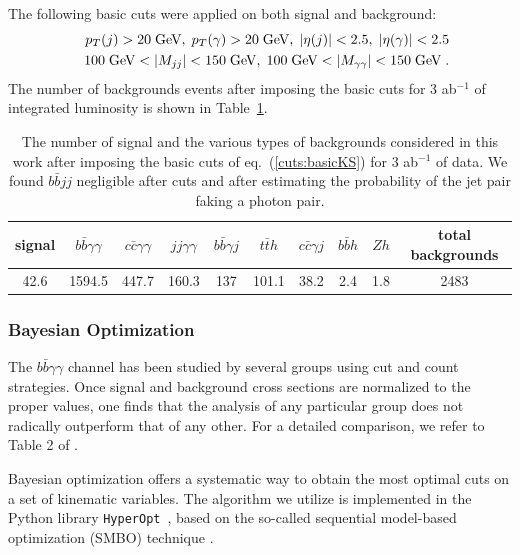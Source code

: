 The following basic cuts were applied on both signal and background:
%
\begin{eqnarray}
& & p_T(j) > 20\;\hbox{GeV},\; p_T(\gamma) > 20\;\hbox{GeV},\; |\eta(j)|<2.5,\; |\eta(\gamma)|<2.5 \nonumber \\
& & 100\;\hbox{GeV} < |M_{jj}| < 150\;\hbox{GeV},\; 100\;\hbox{GeV} < |M_{\gamma\gamma}| < 150\;\hbox{GeV}\; .
\label{cuts:basicKS} 
\end{eqnarray}
%
The number of backgrounds events after imposing the basic cuts for 3 ab$^{-1}$ of integrated luminosity is shown in Table~\ref{table:nevKS}.
%
\begin{table}[!h]
\centering
\begin{tabular}{c|c|c|c|c|c|c|c|c|c}
\hline\hline
signal & $b\bar{b}\gamma\gamma$ & $c\bar{c}\gamma\gamma$ & $jj\gamma\gamma$ & $b\bar{b}\gamma j$ & $t\bar{t}h$ & $c\bar{c}\gamma j$ &  $b\bar{b} h$ & $Zh$ & total backgrounds \\ 
\hline
42.6   & 1594.5  & 447.7   &  160.3 &   137 & 101.1  & 38.2  &  2.4    & 1.8 & 2483 \\
\hline\hline
\end{tabular}
\caption{The number of signal and the various types of backgrounds considered in this work after imposing the basic cuts of eq.~(\ref{cuts:basicKS}) for 3 ab$^{-1}$ of data. We found $b\bar{b} jj$ negligible after cuts and after estimating the probability of the jet pair faking a photon pair.}
\label{table:nevKS}
\end{table}

\subsubsection{Bayesian Optimization}

The $b\bar{b}\gamma\gamma$ channel has been studied by several groups using cut and count strategies. Once signal and background cross sections are normalized to the proper values, one finds that the analysis of any particular group does not radically outperform that of any other. For a detailed comparison, we refer to Table 2 of \cite{Alves:2017ued}. 

Bayesian optimization  offers a systematic way to obtain the most optimal cuts on a set of kinematic variables. The algorithm we utilize is implemented in the Python library \texttt{HyperOpt}~, based on the so-called sequential model-based optimization (SMBO) technique \cite{Bergstra1, Bergstra2, url:hyperopt}. 

